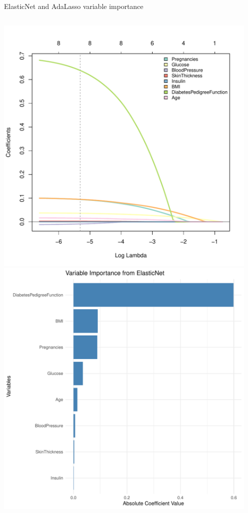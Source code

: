 \begin{frame}{ElasticNet and AdaLasso variable importance}

\vspace*{-1em}\begin{columns}[T]
\begin{column}{0.5\textwidth}
\includegraphics[width=0.85\columnwidth]{./Figures/logist/diabetes_elasticnet.pdf}
\includegraphics[width=0.7\columnwidth]{./Figures/logist/variable_importance_elasticnet.pdf}
\end{column}
\begin{column}{0.5\textwidth}

\end{column}
\end{columns}
\end{frame}
